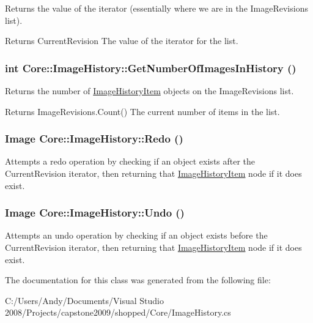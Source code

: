 \label{class_core_1_1_image_history_a421e672ff9f20e10a03bf989cff4442e}
Returns the value of the iterator (essentially where we are in the ImageRevisions list). \begin{DoxyReturn}{Returns}
CurrentRevision The value of the iterator for the list. 
\end{DoxyReturn}
\hypertarget{class_core_1_1_image_history_ae26bcfeed34a733dd372896a86bbc3d4}{
\subsubsection[{GetNumberOfImagesInHistory}]{\setlength{\rightskip}{0pt plus 5cm}int Core::ImageHistory::GetNumberOfImagesInHistory ()}}
\label{class_core_1_1_image_history_ae26bcfeed34a733dd372896a86bbc3d4}
Returns the number of \hyperlink{class_core_1_1_image_history_item}{ImageHistoryItem} objects on the ImageRevisions list. \begin{DoxyReturn}{Returns}
ImageRevisions.Count() The current number of items in the list. 
\end{DoxyReturn}
\hypertarget{class_core_1_1_image_history_afc601ae64181e745d9d94f4b16633a90}{
\subsubsection[{Redo}]{\setlength{\rightskip}{0pt plus 5cm}Image Core::ImageHistory::Redo ()}}
\label{class_core_1_1_image_history_afc601ae64181e745d9d94f4b16633a90}
Attempts a redo operation by checking if an object exists after the CurrentRevision iterator, then returning that \hyperlink{class_core_1_1_image_history_item}{ImageHistoryItem} node if it does exist. \hypertarget{class_core_1_1_image_history_ade2a92df5f5525b0e3951b45b2f3434e}{
\subsubsection[{Undo}]{\setlength{\rightskip}{0pt plus 5cm}Image Core::ImageHistory::Undo ()}}
\label{class_core_1_1_image_history_ade2a92df5f5525b0e3951b45b2f3434e}
Attempts an undo operation by checking if an object exists before the CurrentRevision iterator, then returning that \hyperlink{class_core_1_1_image_history_item}{ImageHistoryItem} node if it does exist. 

The documentation for this class was generated from the following file:\begin{DoxyCompactItemize}
\item 
C:/Users/Andy/Documents/Visual Studio 2008/Projects/capstone2009/shopped/Core/ImageHistory.cs\end{DoxyCompactItemize}
